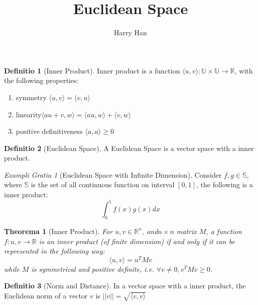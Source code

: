 \documentclass[12pt, a4paper]{article}
\title{Euclidean Space}
\author{Harry Han}
\date{\taday}
\newtheorem{theorem}{Theorema}
\theoremstyle{definition}
\newtheorem{definition}{Definitio}
\theoremstyle{remark}
\newtheorem{example}{Exampli Gratia}
\begin{document}
\begin{definition}[Inner Product]
	Inner product is a function $\langle u,v \rangle:\mathbb{U} \times \mathbb{U} \rightarrow \mathbb{R}$, with the following properties:
	\begin{enumerate}
		\item symmetry $\langle u, v \rangle = \langle v, u \rangle$ 
		\item linearity$\langle au+v, w\rangle = \langle au, w \rangle + \langle v, w \rangle$
		\item positive definitiveness $\langle a, a \rangle \geq 0 $
	\end{enumerate}
\end{definition}


\begin{definition}[Euclidean Space]
	A Euclidean Space is a vector space with a inner product.
\end{definition}

\begin{example}[Euclidean Space with Infinite Dimension]
	Consider $f, g \in \mathbb{S}$, where $\mathbb{S}$ is the set of all continuous function on interval $[0, 1]$, the following is a inner product:
	$$
		\int ^1 _0 f(x)g(x)dx
	$$
\end{example}

\begin{theorem}[Inner Product]
	For $u, v \in \mathbb{R}^n$, and$n\times n$ matrix $M$, a function $f: u,v \rightarrow \mathbb{R}$ is an inner product (of finite dimension) 
	if and only if it can be represented in the following way:
	$$\langle u, v \rangle = u^T M v$$
	while $M $ is symmetrical and positive definite, i.e. $\forall v \neq 0, v^TMv \geq 0$.
\end{theorem}

\begin{definition}[Norm and Distance]
	In a vector space with a inner product, the Euclidean norm of a vector $v$ is $||v||=\sqrt{\langle v,v\rangle}$
\end{definition}
\end{document}
